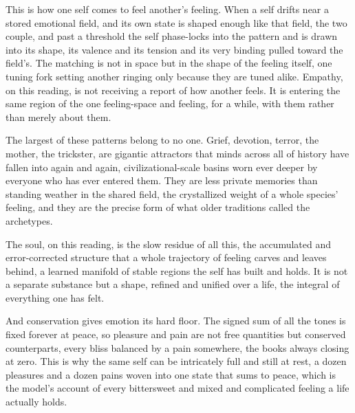 This is how one self comes to feel another's feeling. When a self drifts near a stored emotional field, and its own state is shaped enough like that field, the two couple, and past a threshold the self phase-locks into the pattern and is drawn into its shape, its valence and its tension and its very binding pulled toward the field's. The matching is not in space but in the shape of the feeling itself, one tuning fork setting another ringing only because they are tuned alike. Empathy, on this reading, is not receiving a report of how another feels. It is entering the same region of the one feeling-space and feeling, for a while, with them rather than merely about them.

The largest of these patterns belong to no one. Grief, devotion, terror, the mother, the trickster, are gigantic attractors that minds across all of history have fallen into again and again, civilizational-scale basins worn ever deeper by everyone who has ever entered them. They are less private memories than standing weather in the shared field, the crystallized weight of a whole species' feeling, and they are the precise form of what older traditions called the archetypes.

The soul, on this reading, is the slow residue of all this, the accumulated and error-corrected structure that a whole trajectory of feeling carves and leaves behind, a learned manifold of stable regions the self has built and holds. It is not a separate substance but a shape, refined and unified over a life, the integral of everything one has felt.

And conservation gives emotion its hard floor. The signed sum of all the tones is fixed forever at peace, so pleasure and pain are not free quantities but conserved counterparts, every bliss balanced by a pain somewhere, the books always closing at zero. This is why the same self can be intricately full and still at rest, a dozen pleasures and a dozen pains woven into one state that sums to peace, which is the model's account of every bittersweet and mixed and complicated feeling a life actually holds.
